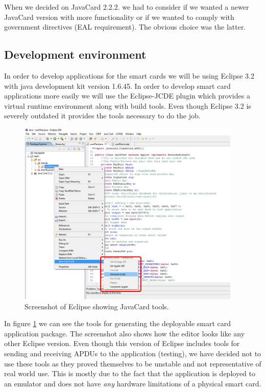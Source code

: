 When we decided on JavaCard 2.2.2. we had to consider if we wanted a newer JavaCard version with more functionality or if we wanted to comply with government directives (EAL requirement). The obvious choice was the latter.

\subsection{Development environment}
In order to develop applications for the smart cards we will be using Eclipse 3.2 with java development kit version 1.6.45. In order to develop smart card applications more easily we will use the Eclipse-JCDE plugin \cite{eclipseJCDE} which provides a virtual runtime environment along with build tools. Even though Eclipse 3.2 is severely outdated it provides the tools necessary to do the job.

\begin{figure}[h!]
  \caption{Screenshot of Eclipse showing JavaCard tools.}
  \label{fig:eclipse}
  \centering
    \includegraphics[width=0.95\textwidth]{images/eclipse.png}
\end{figure}

In figure \ref{fig:eclipse} we can see the tools for generating the deployable smart card application package. The screenshot also shows how the editor looks like any other Eclipse version. Even though this version of Eclipse includes tools for sending and receiving APDUs to the application (testing), we have decided not to use these tools as they proved themselves to be unstable and not representative of real world use. This is mostly due to the fact that the application is deployed to an emulator and does not have \textit{any} hardware limitations of a physical smart card.

